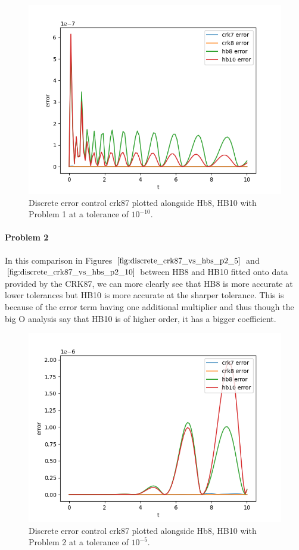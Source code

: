 \begin{figure}[H]
\centering
\includegraphics[width=0.7\linewidth]{./figures/discrete_crk87_vs_hbs_p1_10}
\caption{Discrete error control crk87 plotted alongside Hb8, HB10 with Problem 1 at a tolerance of $10^{-10}$.}
\label{fig:discrete_crk87_vs_hbs_p1_10}
\end{figure}

\paragraph{Problem 2} In this comparison in Figures $\ref{fig:discrete_crk87_vs_hbs_p2_5}$ and $\ref{fig:discrete_crk87_vs_hbs_p2_10}$ between HB8 and HB10 fitted onto data provided by the CRK87, we can more clearly see that HB8 is more accurate at lower tolerances but HB10 is more accurate at the sharper tolerance. This is because of the error term having one additional multiplier and thus though the big O analysis say that HB10 is of higher order, it has a bigger coefficient.

\begin{figure}[H]
\centering
\includegraphics[width=0.7\linewidth]{./figures/discrete_crk87_vs_hbs_p2_5}
\caption{Discrete error control crk87 plotted alongside  Hb8, HB10 with Problem 2 at a tolerance of $10^{-5}$.}
\label{fig:discrete_crk87_vs_hbs_p2_5}
\end{figure}


